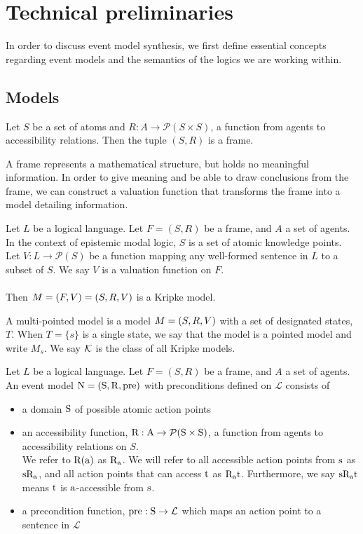 \section{Technical preliminaries}
In order to discuss event model synthesis, we first define essential concepts regarding event
models and the semantics of the logics we are working within.

\subsection{Models}

\begin{defn} \label{frame}
	Let $S$ be a set of atoms and $R: A \to \mathcal{P}(S \times S)$, a function from agents to
	accessibility relations.
	Then the tuple $(S, R)$ is a frame.
\end{defn}

A frame represents a mathematical structure, but holds no meaningful information.
In order to give meaning and be able to draw conclusions from the frame, we can
construct a valuation function that transforms the frame into a model detailing
information.
\begin{defn} \label{model}
	Let $L$ be a logical language.
	Let $F = (S, R)$ be a frame, and $A$ a set of agents.
	In the context of epistemic modal logic, $S$ is a set of atomic knowledge points.
	Let $V: L \to \mathcal{P}(S)$ be a function mapping any
	well-formed	sentence in $L$ to a subset of $S$.
	We say $V$ is a valuation function on $F$.\\
	\\
	Then $M = (F, V) = (S, R, V)$ is a Kripke
	model.
\end{defn}
A multi-pointed model is a model $M = (S, R, V)$ with a set of designated states, $T$.
When $T = \{s\}$ is a single state, we say that the model is a pointed model and write $M_s$.
We say $\mathcal{K}$ is the class of all Kripke models.

\begin{defn} \label{evModel}
	Let $L$ be a logical language.
	Let $F = (S, R)$ be a frame, and $A$ a set of agents.
	An event model $ \mathrm{N = (S, R, pre)} $ with preconditions defined on $\mathcal{L}$ consists of
	\begin{itemize}
		\item a domain $ \mathrm{S} $ of possible atomic action points
		\item an accessibility function, $ \mathrm{R: A \to \mathcal{P}(S \times
        S)} $, a function from agents to
		accessibility relations on $S$.\\
		We refer to $ \mathrm{R(a)} $ as $ \mathrm{R_a} $.
		We will refer to all accessible action points from $ \mathrm{s} $ as
    $ \mathrm{s R_a} $, and all action points that
		can access $ \mathrm{t} $ as $ \mathrm{R_a t} $.
		Furthermore, we say $ \mathrm{s R_a t} $ means $ \mathrm{t} $ is
    $ \mathrm{a} $-accessible from $ \mathrm{s} $.
		\item a precondition function, $ \mathrm{pre: S}  \to \mathcal{L}$ which maps an action point to a
		sentence in $\mathcal{L}$
	\end{itemize}
\end{defn}

